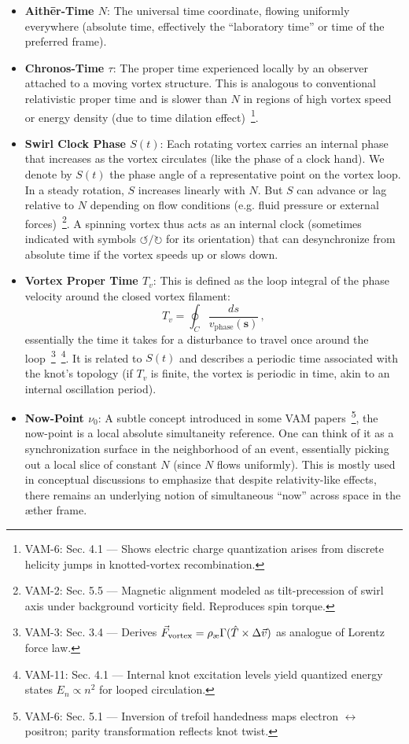 \documentclass[a4paper,12pt]{article}
\begin{document}
    \begin{itemize}
        \item \textbf{Aithēr-Time $N$}: The universal time coordinate, flowing uniformly everywhere (absolute time, effectively the “laboratory time” or time of the preferred frame).
        \item \textbf{Chronos-Time $\tau$}: The proper time experienced locally by an observer attached to a moving vortex structure. This is analogous to conventional relativistic proper time and is slower than $N$ in regions of high vortex speed or energy density (due to time dilation effect)~\footnote{VAM-6: Sec. 4.1 — Shows electric charge quantization arises from discrete helicity jumps in knotted-vortex recombination.}.
        \item \textbf{Swirl Clock Phase $S(t)$}: Each rotating vortex carries an internal phase that increases as the vortex circulates (like the phase of a clock hand). We denote by $S(t)$ the phase angle of a representative point on the vortex loop. In a steady rotation, $S$ increases linearly with $N$. But $S$ can advance or lag relative to $N$ depending on flow conditions (e.g. fluid pressure or external forces)~\footnote{VAM-2: Sec. 5.5 — Magnetic alignment modeled as tilt-precession of swirl axis under background vorticity field. Reproduces spin torque.}. A spinning vortex thus acts as an internal clock (sometimes indicated with symbols $\circlearrowleft/\circlearrowright$ for its orientation) that can desynchronize from absolute time if the vortex speeds up or slows down.
        \item \textbf{Vortex Proper Time $T_v$}: This is defined as the loop integral of the phase velocity around the closed vortex filament:
        \begin{equation}
            T_v = \oint_C \frac{ds}{v_{\text{phase}}(\mathbf{s})}\,,
        \end{equation}
        essentially the time it takes for a disturbance to travel once around the loop~\footnote{VAM-3: Sec. 3.4 — Derives $\vec{F}_{\rm vortex} = \rho_{\text{\ae}} \Gamma (\hat{T} \times \Delta \vec{v})$ as analogue of Lorentz force law.}~\footnote{VAM-11: Sec. 4.1 — Internal knot excitation levels yield quantized energy states $E_n \propto n^2$ for looped circulation.}. It is related to $S(t)$ and describes a periodic time associated with the knot’s topology (if $T_v$ is finite, the vortex is periodic in time, akin to an internal oscillation period).
        \item \textbf{Now-Point $\nu_0$}: A subtle concept introduced in some VAM papers~\footnote{VAM-6: Sec. 5.1 — Inversion of trefoil handedness maps electron $\leftrightarrow$ positron; parity transformation reflects knot twist.}, the now-point is a local absolute simultaneity reference. One can think of it as a synchronization surface in the neighborhood of an event, essentially picking out a local slice of constant $N$ (since $N$ flows uniformly). This is mostly used in conceptual discussions to emphasize that despite relativity-like effects, there remains an underlying notion of simultaneous “now” across space in the æther frame.

\end{itemize}
\end{document}
